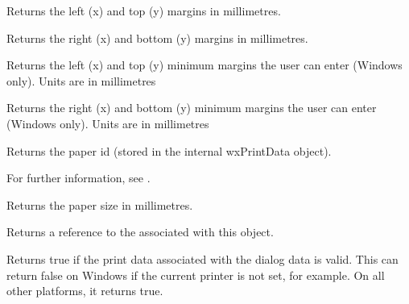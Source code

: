 Returns the left (x) and top (y) margins in millimetres.

\label{wxpagesetupdialogdatagetmarginbottomright}


Returns the right (x) and bottom (y) margins in millimetres.

\label{wxpagesetupdialogdatagetminmargintopleft}


Returns the left (x) and top (y) minimum margins the user can enter (Windows only). Units
are in millimetres

\label{wxpagesetupdialogdatagetminmarginbottomright}


Returns the right (x) and bottom (y) minimum margins the user can enter (Windows only). Units
are in millimetres

\label{wxpagesetupdialogdatagetpaperid}


Returns the paper id (stored in the internal wxPrintData object).

For further information, see .

\label{wxpagesetupdialogdatagetpapersize}


Returns the paper size in millimetres.

\label{wxpagesetupdialogdatagetprintdata}


Returns a reference to the  associated with this object.

\label{wxpagesetupdialogdataisok}


Returns true if the print data associated with the dialog data is valid.
This can return false on Windows if the current printer is not set, for example.
On all other platforms, it returns true.

